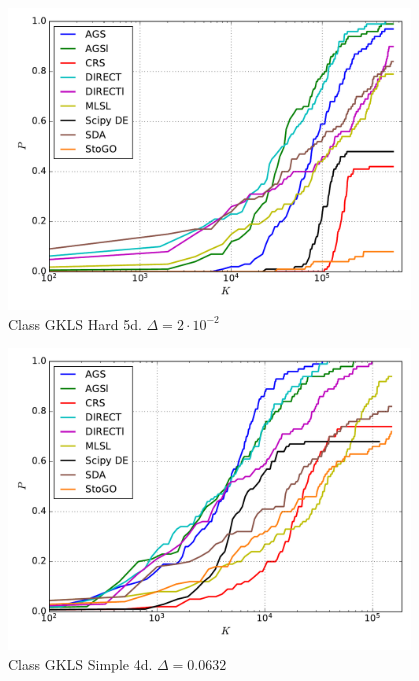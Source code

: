 \documentclass[a4paper]{article}
\begin{document}
\begin{figure}[H]
  \center
  \includegraphics[width=0.95\textwidth]{../experiments/gklsh5d/cmc.pdf}
  \caption{Class GKLS Hard 5d. $\Delta=2\cdot10^{-2}$}
\end{figure}


\begin{figure}[H]
  \center
  \includegraphics[width=0.95\textwidth]{../experiments/gklss4d_serg/cmc.pdf}
  \caption{Class GKLS Simple 4d. $\Delta=0.0632$}
\end{figure}

\end{document}
